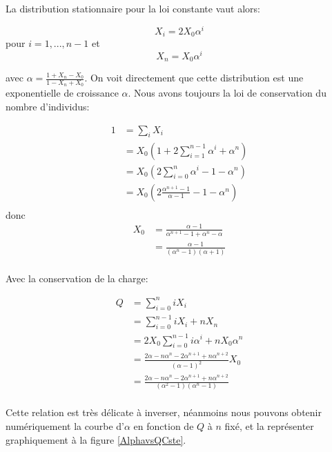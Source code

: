 La distribution stationnaire pour la loi constante vaut alors:

\begin{equation}
X_i=2 X_0 \alpha^i
\end{equation}
pour $i=1,...,n-1$ et 
\begin{equation}
X_n= X_0 \alpha^i
\end{equation}

avec $\alpha = \frac{1+X_n-X_0}{1-X_n+X_0}$.
On voit directement que cette distribution est une exponentielle de croissance $\alpha$. Nous avons toujours la loi de conservation du nombre d'individus:

\begin{equation}
\begin{aligned}
1&= \sum_i X_i\\
	&= X_0 (1+2\sum_{i=1}^{n-1}\alpha^i+\alpha^n)\\
	&= X_0 (2\sum_{i=0}^{n}\alpha^i-1-\alpha^n)\\
	&= X_0 (2 \frac{\alpha^{n+1}-1}{\alpha-1}-1-\alpha^n)\\
\end{aligned}
\end{equation}
donc
\begin{equation}
\begin{aligned}
X_0	&= \frac{\alpha-1}{\alpha^{n+1}-1+\alpha^n-\alpha}\\
	&= \frac{\alpha-1}{(\alpha^{n}-1)(\alpha+1)}\\
\end{aligned}
\end{equation}

Avec la conservation de la charge:

\begin{equation}
\begin{aligned}
Q	&= \sum_{i=0}^n i X_i\\
	&= \sum_{i=0}^{n-1} i X_i + n X_n\\
	&= 2 X_0 \sum_{i=0}^{n-1} i \alpha^i + n X_0 \alpha^n\\
	&= \frac{2\alpha -n\alpha^n-2\alpha^{n+1}+n\alpha^{n+2}}{(\alpha-1)^2}X_0\\
	&= \frac{2\alpha -n\alpha^n-2\alpha^{n+1}+n\alpha^{n+2}}{(\alpha^2-1)(\alpha^{n}-1)}\\
\end{aligned}
\end{equation}

Cette relation est très délicate à inverser, néanmoins nous pouvons obtenir numériquement la courbe d'$\alpha$ en fonction de $Q$ à $n$ fixé, et la représenter graphiquement à la figure \ref{AlphavsQCste}.\\

